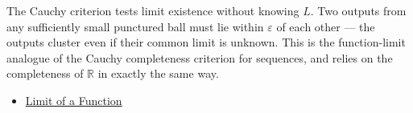 \begin{remark*}[Interpretation]
The Cauchy criterion tests limit existence without knowing $L$. Two
outputs from any sufficiently small punctured ball must lie within
$\varepsilon$ of each other — the outputs cluster even if their
common limit is unknown. This is the function-limit analogue of the
Cauchy completeness criterion for sequences, and relies on the
completeness of $\mathbb{R}$ in exactly the same way.
\end{remark*}

\begin{dependencies}
\begin{itemize}
  \item \hyperref[def:limit-function]{Limit of a Function}
\end{itemize}
\end{dependencies}
